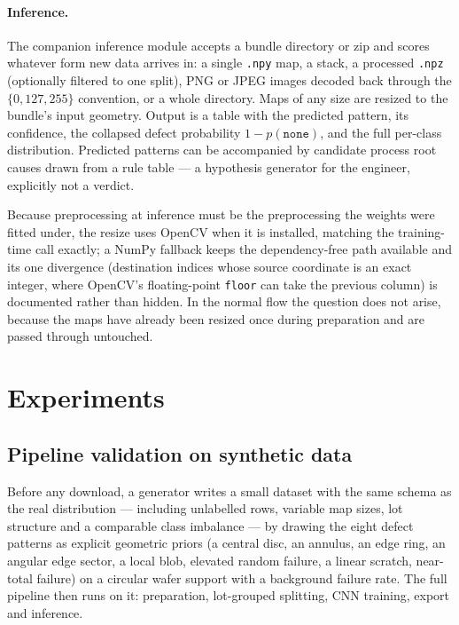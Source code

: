 \documentclass[11pt,a4paper]{article}
\begin{document}
\paragraph{Inference.}
The companion inference module accepts a bundle directory or zip and scores
whatever form new data arrives in: a single \texttt{.npy} map, a stack,
a processed \texttt{.npz} (optionally filtered to one split), PNG or JPEG
images decoded back through the $\{0,127,255\}$ convention, or a whole
directory. Maps of any size are resized to the bundle's input geometry. Output
is a table with the predicted pattern, its confidence, the collapsed defect
probability $1 - p(\texttt{none})$, and the full per-class distribution.
Predicted patterns can be accompanied by candidate process root causes drawn
from a rule table --- a hypothesis generator for the engineer, explicitly not a
verdict.

Because preprocessing at inference must be the preprocessing the weights were
fitted under, the resize uses OpenCV when it is installed, matching the
training-time call exactly; a NumPy fallback keeps the dependency-free path
available and its one divergence (destination indices whose source coordinate
is an exact integer, where OpenCV's floating-point \texttt{floor} can take the
previous column) is documented rather than hidden. In the normal flow the
question does not arise, because the maps have already been resized once during
preparation and are passed through untouched.

\section{Experiments}

\subsection{Pipeline validation on synthetic data}
\label{sec:synthetic}

Before any download, a generator writes a small dataset with the same schema as
the real distribution --- including unlabelled rows, variable map sizes, lot
structure and a comparable class imbalance --- by drawing the eight defect
patterns as explicit geometric priors (a central disc, an annulus, an edge
ring, an angular edge sector, a local blob, elevated random failure, a linear
scratch, near-total failure) on a circular wafer support with a background
failure rate. The full pipeline then runs on it: preparation, lot-grouped
splitting, CNN training, export and inference.
\end{document}
